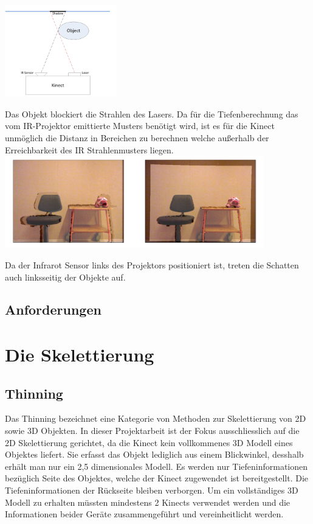 \documentclass[
	12pt,
	a4paper,
	BCOR10mm,
	DIV14,
	listof=totoc,
	bibliography=totoc,
	headsepline
]{scrreprt}
\begin{document}
\includegraphics[height=4cm]{Res/Schatten_Strahl.png}


Das Objekt blockiert die Strahlen des Lasers. Da für die Tiefenberechnung das vom IR-Projektor emittierte Musters benötigt wird, ist es für die Kinect unmöglich die Distanz in Bereichen zu berechnen welche außerhalb der Erreichbarkeit des IR Strahlenmusters liegen. \\

\includegraphics[height=4cm]{Res/Schatten.png}


Da der Infrarot Sensor links des Projektors positioniert ist, treten die Schatten auch linksseitig der Objekte auf. 


\section{Anforderungen}

\chapter{Die Skelettierung}
\section{Thinning}

Das Thinning bezeichnet eine Kategorie von Methoden zur Skelettierung von 2D sowie 3D Objekten. In dieser Projektarbeit ist der Fokus ausschliesslich auf die 2D Skelettierung gerichtet, da die Kinect kein vollkommenes 3D Modell eines Objektes liefert. Sie erfasst das Objekt lediglich aus einem Blickwinkel, desshalb erhält man nur ein 2,5 dimensionales Modell. Es werden nur Tiefeninformationen bezüglich Seite des Objektes, welche der Kinect zugewendet ist bereitgestellt. Die  Tiefeninformationen der Rückseite bleiben verborgen. Um ein vollständiges 3D Modell zu erhalten müssten mindestens 2 Kinects verwendet werden und die Informationen beider Geräte zusammengeführt und vereinheitlicht werden. 
\end{document}
